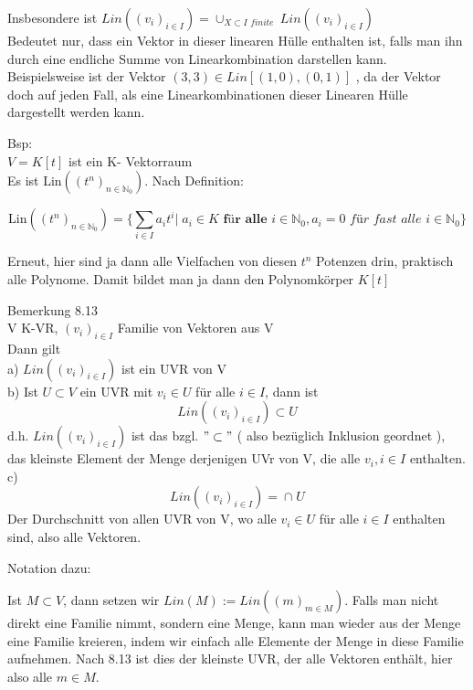 \documentclass[smallheadings,12pt,a4paper]{scrartcl}
\begin{document}
Insbesondere ist $\textit{Lin}((v_i)_{i \in I}) = \cup_{X \subset I \textit{ finite }} \textit{Lin}((v_i)_{i \in I}) $ \\

Bedeutet nur, dass ein Vektor in dieser linearen Hülle enthalten ist, falls man ihn durch eine endliche Summe von Linearkombination darstellen kann. Beispielsweise ist der Vektor $(3,3) \in \textit{Lin}[(1,0),(0,1)]$ , da der Vektor doch auf jeden Fall, als eine Linearkombinationen dieser Linearen Hülle dargestellt werden kann.\\

\item Bsp:\\
$V= K[t]$ ist ein K- Vektorraum \\

Es ist Lin$((t^n)_{n\in \mathbb{N}_0})$. Nach Definition:

$$\text{Lin}((t^n)_{n\in \mathbb{N}_0}) = \{\sum_{i \in I} a_i t^{i} | \; a_i \in K \textbf{ für alle } i \in \mathbb{N}_0, a_i = 0 \textit{ für fast alle } i \in \mathbb{N}_0 \} $$

Erneut, hier sind ja dann alle Vielfachen von diesen $t^n$ Potenzen drin, praktisch alle Polynome. Damit bildet man ja dann den Polynomkörper $K[t]$ \\

\newpage

\item Bemerkung 8.13 \\

V K-VR, $(v_i)_{i \in I}$ Familie von Vektoren aus V \\

Dann gilt \\
a) $\textit{Lin}((v_i)_{i \in I}) $ ist ein UVR von V \\
b) Ist $ U \subset V $ ein UVR mit $v_i \in U $ für alle $ i \in I $, dann ist $$ \textit{Lin}((v_i)_{i \in I}) \subset U $$
d.h. $\textit{Lin}((v_i)_{i \in I}) $ ist das bzgl. $ "\subset" $ ( also bezüglich Inklusion geordnet ), das kleinste Element der Menge derjenigen UVr von V, die alle $v_i, i \in I$ enthalten. \\
c) $$ \textit{Lin}((v_i)_{i \in I}) =  \cap_{} U $$ Der Durchschnitt von allen UVR von V, wo alle $v_i \in U$ für alle 
$ i \in I $ enthalten sind, also alle Vektoren. 

\item[Notation dazu:]

Ist $M \subset V$, dann setzen wir $Lin(M):=\textit{Lin}((m)_{m \in M}) $. Falls man nicht direkt eine Familie nimmt, sondern eine Menge, kann man wieder aus der Menge eine Familie kreieren, indem wir einfach alle Elemente der Menge in diese Familie aufnehmen. Nach 8.13 ist dies der kleinste UVR, der alle Vektoren enthält, hier also alle $m\in M$. \\
\end{document}
